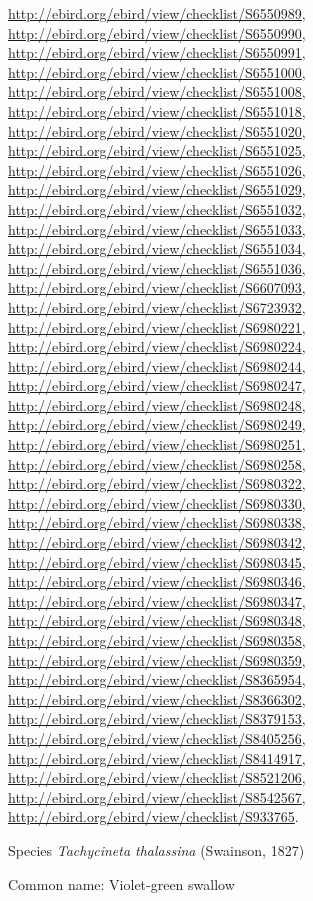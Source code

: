 \documentclass[9pt, article]{memoir}
\begin{document}
\begin{multicols}{2}
\url{http://ebird.org/ebird/view/checklist/S6550989}, 
\url{http://ebird.org/ebird/view/checklist/S6550990}, 
\url{http://ebird.org/ebird/view/checklist/S6550991}, 
\url{http://ebird.org/ebird/view/checklist/S6551000}, 
\url{http://ebird.org/ebird/view/checklist/S6551008}, 
\url{http://ebird.org/ebird/view/checklist/S6551018}, 
\url{http://ebird.org/ebird/view/checklist/S6551020}, 
\url{http://ebird.org/ebird/view/checklist/S6551025}, 
\url{http://ebird.org/ebird/view/checklist/S6551026}, 
\url{http://ebird.org/ebird/view/checklist/S6551029}, 
\url{http://ebird.org/ebird/view/checklist/S6551032}, 
\url{http://ebird.org/ebird/view/checklist/S6551033}, 
\url{http://ebird.org/ebird/view/checklist/S6551034}, 
\url{http://ebird.org/ebird/view/checklist/S6551036}, 
\url{http://ebird.org/ebird/view/checklist/S6607093}, 
\url{http://ebird.org/ebird/view/checklist/S6723932}, 
\url{http://ebird.org/ebird/view/checklist/S6980221}, 
\url{http://ebird.org/ebird/view/checklist/S6980224}, 
\url{http://ebird.org/ebird/view/checklist/S6980244}, 
\url{http://ebird.org/ebird/view/checklist/S6980247}, 
\url{http://ebird.org/ebird/view/checklist/S6980248}, 
\url{http://ebird.org/ebird/view/checklist/S6980249}, 
\url{http://ebird.org/ebird/view/checklist/S6980251}, 
\url{http://ebird.org/ebird/view/checklist/S6980258}, 
\url{http://ebird.org/ebird/view/checklist/S6980322}, 
\url{http://ebird.org/ebird/view/checklist/S6980330}, 
\url{http://ebird.org/ebird/view/checklist/S6980338}, 
\url{http://ebird.org/ebird/view/checklist/S6980342}, 
\url{http://ebird.org/ebird/view/checklist/S6980345}, 
\url{http://ebird.org/ebird/view/checklist/S6980346}, 
\url{http://ebird.org/ebird/view/checklist/S6980347}, 
\url{http://ebird.org/ebird/view/checklist/S6980348}, 
\url{http://ebird.org/ebird/view/checklist/S6980358}, 
\url{http://ebird.org/ebird/view/checklist/S6980359}, 
\url{http://ebird.org/ebird/view/checklist/S8365954}, 
\url{http://ebird.org/ebird/view/checklist/S8366302}, 
\url{http://ebird.org/ebird/view/checklist/S8379153}, 
\url{http://ebird.org/ebird/view/checklist/S8405256}, 
\url{http://ebird.org/ebird/view/checklist/S8414917}, 
\url{http://ebird.org/ebird/view/checklist/S8521206}, 
\url{http://ebird.org/ebird/view/checklist/S8542567}, 
\url{http://ebird.org/ebird/view/checklist/S933765}.

\vspace{6pt}\noindent\hspace{36pt}Species \textit{Tachycineta thalassina} (Swainson, 1827)


Common name: Violet-green swallow


\end{multicols}
\end{document}
